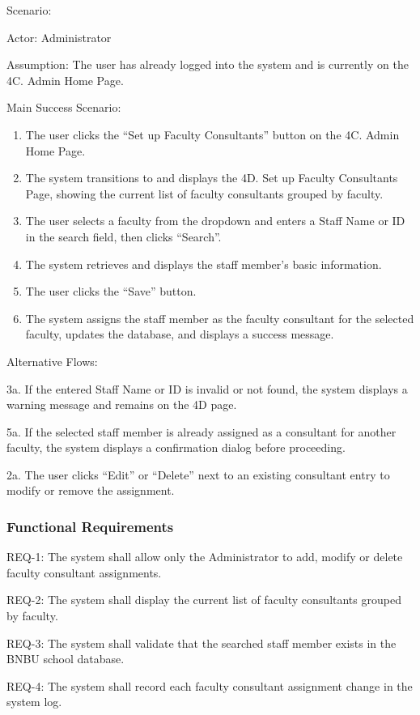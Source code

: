Scenario:

Actor: Administrator

Assumption: The user has already logged into the system and is currently on the 4C. Admin Home Page.

Main Success Scenario:
\begin{enumerate}
\item The user clicks the ``Set up Faculty Consultants'' button on the 4C. Admin Home Page.
\item The system transitions to and displays the 4D. Set up Faculty Consultants Page, showing the current list of faculty consultants grouped by faculty.
\item The user selects a faculty from the dropdown and enters a Staff Name or ID in the search field, then clicks ``Search''.
\item The system retrieves and displays the staff member's basic information.
\item The user clicks the ``Save'' button.
\item The system assigns the staff member as the faculty consultant for the selected faculty, updates the database, and displays a success message.
\end{enumerate}

Alternative Flows:

3a. If the entered Staff Name or ID is invalid or not found, the system displays a warning message and remains on the 4D page.

5a. If the selected staff member is already assigned as a consultant for another faculty, the system displays a confirmation dialog before proceeding.

2a. The user clicks ``Edit'' or ``Delete'' next to an existing consultant entry to modify or remove the assignment.

\subsubsection{Functional Requirements}

REQ-1: The system shall allow only the Administrator to add, modify or delete faculty consultant assignments.

REQ-2: The system shall display the current list of faculty consultants grouped by faculty.

REQ-3: The system shall validate that the searched staff member exists in the BNBU school database.

REQ-4: The system shall record each faculty consultant assignment change in the system log.

